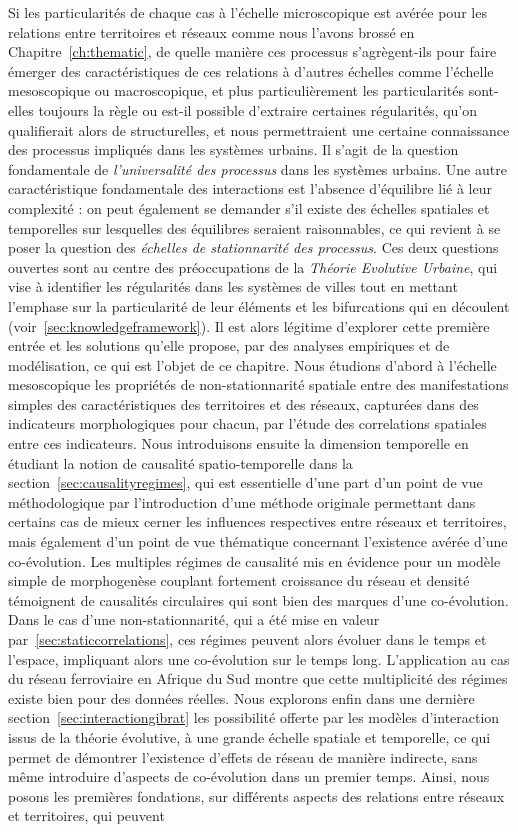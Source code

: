 Si les particularités de chaque cas à l'échelle microscopique est avérée pour les relations entre territoires et réseaux comme nous l'avons brossé en Chapitre~\ref{ch:thematic}, de quelle manière ces processus s'agrègent-ils pour faire émerger des caractéristiques de ces relations à d'autres échelles comme l'échelle mesoscopique ou macroscopique, et plus particulièrement les particularités sont-elles toujours la règle ou est-il possible d'extraire certaines régularités, qu'on qualifierait alors de structurelles, et nous permettraient une certaine connaissance des processus impliqués dans les systèmes urbains. Il s'agit de la question fondamentale de \emph{l'universalité des processus} dans les systèmes urbains. Une autre caractéristique fondamentale des interactions est l'absence d'équilibre lié à leur complexité : on peut également se demander s'il existe des échelles spatiales et temporelles sur lesquelles des équilibres seraient raisonnables, ce qui revient à se poser la question des \emph{échelles de stationnarité des processus}. Ces deux questions ouvertes sont au centre des préoccupations de la \emph{Théorie Evolutive Urbaine}, qui vise à identifier les régularités dans les systèmes de villes tout en mettant l'emphase sur la particularité de leur éléments et les bifurcations qui en découlent (voir~\ref{sec:knowledgeframework}). Il est alors légitime d'explorer cette première entrée et les solutions qu'elle propose, par des analyses empiriques et de modélisation, ce qui est l'objet de ce chapitre. Nous étudions d'abord à l'échelle mesoscopique les propriétés de non-stationnarité spatiale entre des manifestations simples des caractéristiques des territoires et des réseaux, capturées dans des indicateurs morphologiques pour chacun, par l'étude des correlations spatiales entre ces indicateurs. Nous introduisons ensuite la dimension temporelle en étudiant la notion de causalité spatio-temporelle dans la section~\ref{sec:causalityregimes}, qui est essentielle d'une part d'un point de vue méthodologique par l'introduction d'une méthode originale permettant dans certains cas de mieux cerner les influences respectives entre réseaux et territoires, mais également d'un point de vue thématique concernant l'existence avérée d'une co-évolution. Les multiples régimes de causalité mis en évidence pour un modèle simple de morphogenèse couplant fortement croissance du réseau et densité témoignent de causalités circulaires qui sont bien des marques d'une co-évolution. Dans le cas d'une non-stationnarité, qui a été mise en valeur par~\ref{sec:staticcorrelations}, ces régimes peuvent alors évoluer dans le temps et l'espace, impliquant alors une co-évolution sur le temps long. L'application au cas du réseau ferroviaire en Afrique du Sud montre que cette multiplicité des régimes existe bien pour des données réelles. Nous explorons enfin dans une dernière section~\ref{sec:interactiongibrat} les possibilité offerte par les modèles d'interaction issus de la théorie évolutive, à une grande échelle spatiale et temporelle, ce qui permet de démontrer l'existence d'effets de réseau de manière indirecte, sans même introduire d'aspects de co-évolution dans un premier temps. Ainsi, nous posons les premières fondations, sur différents aspects des relations entre réseaux et territoires, qui peuvent 